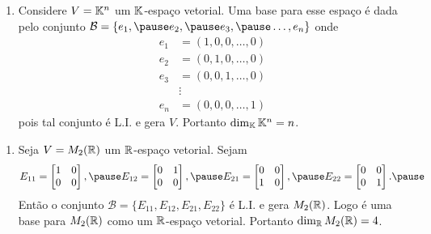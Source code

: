 \documentclass{beamer}
\begin{document}
\begin{frame}
    \begin{exemplos}
        \begin{enumerate}[label={\roman*})]
            \conti
            \item Considere $V = \mathbb{K}^n$ um $\mathbb{K}$-espaço vetorial. \pause Uma base para esse espaço é dada pelo conjunto \pause $\mathcal{B} = \{e_1, \pause e_2, \pause e_3, \pause \dots, e_n\}$ onde\pause
            \begin{align*}
                e_1 &= (1, 0, 0, \dots, 0)\\
                e_2 &= (0, 1, 0, \dots, 0)\\
                e_3 &= (0, 0, 1, \dots, 0)\\
                &\vdots\\
                e_n &= (0, 0, 0, \dots, 1)
            \end{align*}\pause
            pois tal conjunto é L.I. \pause e gera $V$. \pause Portanto $\dim_{\mathbb{K}}\mathbb{K}^n = n$.
            \seti
        \end{enumerate}
    \end{exemplos}
\end{frame}

\begin{frame}
    \begin{exemplos}
        \begin{enumerate}[label={\roman*})]
            \conti
            \item Seja $V = M_2(\mathbb{R})$ um $\mathbb{R}$-espaço vetorial. \pause Sejam
            \[
                E_{11} = \begin{bmatrix}1 & 0\\0 & 0\end{bmatrix},\pause
                E_{12} = \begin{bmatrix}0 & 1\\0 & 0\end{bmatrix},\pause
                E_{21} = \begin{bmatrix}0 & 0\\1 & 0\end{bmatrix},\pause
                E_{22} = \begin{bmatrix}0 & 0\\0 & 1\end{bmatrix}.\pause
            \]
            Então o conjunto $\mathcal{B} = \{E_{11}, E_{12}, E_{21}, E_{22}\}$ é L.I. \pause e gera $M_2(\mathbb{R})$. \pause Logo é uma base para $M_2(\mathbb{R})$ \pause como um $\mathbb{R}$-espaço vetorial. \pause Portanto $\dim_{\mathbb{R}} M_2(\mathbb{R}) = 4$.
            \seti
        \end{enumerate}
    \end{exemplos}
\end{frame}
\end{document}
